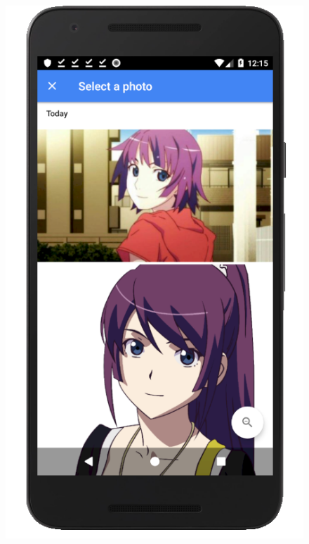 \documentclass[12pt]{article}
\begin{document}
\begin{figure}
	\includegraphics[scale=0.25]{Gallery.png}

\end{figure}
\end{document}
